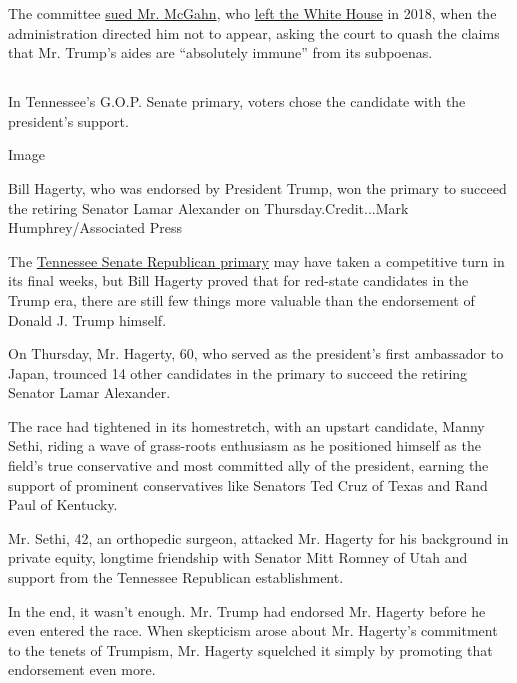 The committee
\href{https://www.nytimes3xbfgragh.onion/2019/08/07/us/politics/don-mcgahn-subpoena.html}{sued
Mr. McGahn}, who
\href{https://www.nytimes3xbfgragh.onion/interactive/2018/03/16/us/politics/all-the-major-firings-and-resignations-in-trump-administration.html}{left
the White House} in 2018, when the administration directed him not to
appear, asking the court to quash the claims that Mr. Trump's aides are
``absolutely immune'' from its subpoenas.

\hypertarget{-7}{%
\subsection{}\label{-7}}

In Tennessee's G.O.P. Senate primary, voters chose the candidate with
the president's support.

Image

Bill Hagerty, who was endorsed by President Trump, won the primary to
succeed the retiring Senator Lamar Alexander on Thursday.Credit...Mark
Humphrey/Associated Press

The
\href{https://www.nytimes3xbfgragh.onion/2020/08/06/us/politics/tennessee-senate-primary-hagerty.html}{Tennessee
Senate Republican primary} may have taken a competitive turn in its
final weeks, but Bill Hagerty proved that for red-state candidates in
the Trump era, there are still few things more valuable than the
endorsement of Donald J. Trump himself.

On Thursday, Mr. Hagerty, 60, who served as the president's first
ambassador to Japan, trounced 14 other candidates in the primary to
succeed the retiring Senator Lamar Alexander.

The race had tightened in its homestretch, with an upstart candidate,
Manny Sethi, riding a wave of grass-roots enthusiasm as he positioned
himself as the field's true conservative and most committed ally of the
president, earning the support of prominent conservatives like Senators
Ted Cruz of Texas and Rand Paul of Kentucky.

Mr. Sethi, 42, an orthopedic surgeon, attacked Mr. Hagerty for his
background in private equity, longtime friendship with Senator Mitt
Romney of Utah and support from the Tennessee Republican establishment.

In the end, it wasn't enough. Mr. Trump had endorsed Mr. Hagerty before
he even entered the race. When skepticism arose about Mr. Hagerty's
commitment to the tenets of Trumpism, Mr. Hagerty squelched it simply by
promoting that endorsement even more.

